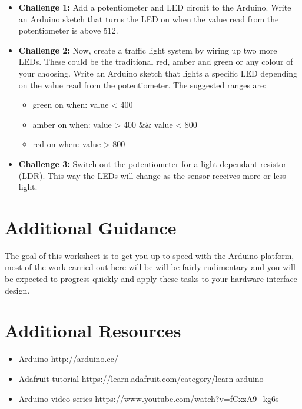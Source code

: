 \documentclass{../../fal_assignment}
\begin{document}
\begin{itemize}
	\item \textbf{Challenge 1:} Add a potentiometer and LED circuit to the Arduino. Write an Arduino sketch that turns the LED on when the value read from the potentiometer is above 512.
	\item \textbf{Challenge 2:} Now, create a traffic light system by wiring up two more LEDs. These could be the traditional red, amber and green or any colour of your choosing. Write an Arduino sketch that lights a specific LED depending on the value read from the potentiometer. The suggested ranges are: 
	\begin{itemize}
		\item green on when: value < 400
		\item amber on when:  value > 400 \&\& value < 800 
		\item red on when: value > 800
	\end{itemize}
	\item \textbf{Challenge 3:} Switch out the potentiometer for a light dependant resistor (LDR). This way the LEDs will change as the sensor receives more or less light.  
\end{itemize}


\section*{Additional Guidance}

The goal of this worksheet is to get you up to speed with the Arduino platform, most of the work carried out here will be will be fairly rudimentary and you will be expected to progress quickly and apply these tasks to your hardware interface design.

\section*{Additional Resources}

\begin{itemize}
    \item Arduino \url{http://arduino.cc/}
    \item Adafruit tutorial \url{https://learn.adafruit.com/category/learn-arduino}
    \item Arduino video series \url{https://www.youtube.com/watch?v=fCxzA9_kg6s}
\end{itemize}
\end{document}
